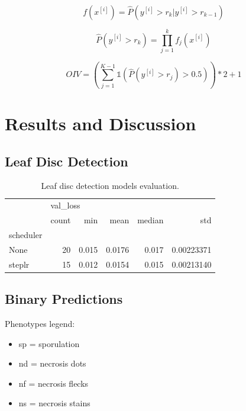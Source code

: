 \documentclass[english]{article}
\begin{document}
\begin{equation}
    f(x^{[i]}) = \hat{P}(y^{[i]} > r_{k}|y^{[i]} > r_{k-1})\label{fml:binclass}
\end{equation}

\begin{equation}
    \hat{P}(y^{[i]} > r_{k}) = \prod_{j=1}^{k}f_{j}(x^{[i]})\label{fml:unconditionalprob}
\end{equation}

\begin{equation}
    OIV = (\sum_{j=1}^{K-1}\mathbb{1}(\hat{P}(y^{[i]} > r_{j}) > 0.5))*2 + 1\label{fml:rankprob}
\end{equation}

\section{Results and Discussion}

\subsection{Leaf Disc Detection}

\begin{table}[H]
    \centering
    \caption{Leaf disc detection models evaluation.}
    \label{tab:leafdiscdetectionresult}
    \begin{tabular}{lrrrrr}
        \toprule
        {}        & \multicolumn{5}{l}{val\_loss}                                        \\
        {}        & count                         & min   & mean   & median & std        \\
        scheduler &                               &       &        &        &            \\
        \midrule
        None      & 20                            & 0.015 & 0.0176 & 0.017  & 0.00223371 \\
        steplr    & 15                            & 0.012 & 0.0154 & 0.015  & 0.00213140 \\
        \bottomrule
    \end{tabular}
\end{table}




\subsection{Binary Predictions}

Phenotypes legend:
\begin{itemize}
    \item sp = sporulation
    \item nd = necrosis dots
    \item nf = necrosis flecks
    \item ns = necrosis stains
\end{itemize}
\end{document}

